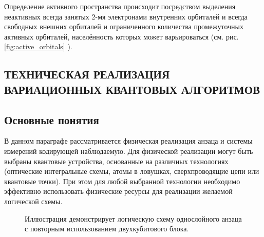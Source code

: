 \documentclass[14pt]{extarticle}
\begin{document}
\qquad Определение активного пространства происходит посредством выделения неактивных всегда занятых 2-мя электронами внутренних орбиталей и всегда свободных внешних орбиталей и ограниченного количества промежуточных активных орбиталей, населённость которых может варьироваться (см. рис.\ref{fig:active_orbitals} ).


\newpage

\begin{center}
\section[ТЕХНИЧЕСКАЯ РЕАЛИЗАЦИЯ ВАРИАЦИОННЫХ КВАНТОВЫХ АЛГОРИТМОВ]{ТЕХНИЧЕСКАЯ РЕАЛИЗАЦИЯ \linebreak ВАРИАЦИОННЫХ КВАНТОВЫХ \linebreak АЛГОРИТМОВ} \label{sec:technical_realization_section}
\end{center}


\subsection{Основные понятия}

\qquad В данном параграфе рассматривается физическая реализация анзаца и системы измерений кодирующей наблюдаемую. Для физической реализации могут быть выбраны квантовые устройства, основанные на различных технологиях (оптические интегральные схемы, атомы в ловушках, сверхпроводящие цепи или квантовые точки). При этом для любой выбранной технологии необходимо эффективно использовать физические ресурсы для реализации желаемой логической схемы.

\begin{figure}[H]
\caption{Иллюстрация демонстрирует логическую схему однослойного анзаца с повторным использованием двухкубитового блока.}\label{fig:MPS}
\end{figure}
\end{document}
